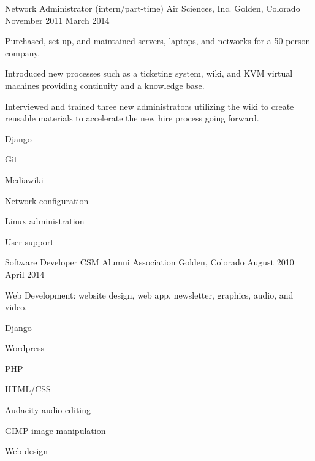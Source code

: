 \begin{cventries}
  \cventry%
    {Network Administrator (intern/part-time)} %
    {Air Sciences, Inc.} %
    {Golden, Colorado} %
    {November 2011 \- March 2014} %
    {%
      \begin{cvitems} %
        \item {Purchased, set up, and maintained servers, laptops, and networks for a 50 person company.}
        \item {Introduced new processes such as a ticketing system, wiki, and KVM virtual machines \- providing continuity and a knowledge base.}
        \item {Interviewed and trained three new administrators \- utilizing the wiki to create reusable materials to accelerate the new hire process going forward.}
      \end{cvitems}
    }
    \begin{cventryskills}
      \item Django
      \item Git
      \item Mediawiki
      \item Network configuration
      \item Linux administration
      \item User support
    \end{cventryskills}

  \cventry%
    {Software Developer} %
    {CSM Alumni Association} %
    {Golden, Colorado} %
    {August 2010 \- April 2014} %
    {%
      \begin{cvitems} %
        \item {Web Development: website design, web app, newsletter, graphics, audio, and video.}
      \end{cvitems}
    }
    \begin{cventryskills}
      \item Django
      \item Wordpress
      \item PHP
      \item HTML/CSS
      \item Audacity audio editing
      \item GIMP image manipulation
      \item Web design
    \end{cventryskills}
\end{cventries}
